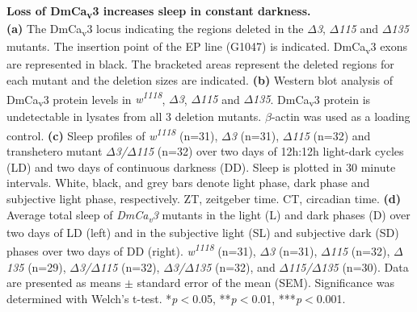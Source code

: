 \label{fig:S2}
\textbf{Loss of DmCa\textsubscript{v}3 increases sleep in constant darkness.}
\\
\textbf{(a)} The DmCa\textsubscript{v}3 locus indicating the regions deleted in the \emph{$\Delta$3}, \emph{$\Delta$115} and \emph{$\Delta$135} mutants.
The insertion point of the EP line (G1047) is indicated.
DmCa\textsubscript{v}3 exons are represented in black.
The bracketed areas represent the deleted regions for each mutant and the deletion sizes are indicated.
\textbf{(b)} Western blot analysis of DmCa\textsubscript{v}3 protein levels in \emph{w\textsuperscript{1118}}, \emph{$\Delta$3}, \emph{$\Delta$115} and \emph{$\Delta$135}.
DmCa\textsubscript{v}3 protein is undetectable in lysates from all 3 deletion mutants.
$\beta$-actin was used as a loading control.
\textbf{(c)} Sleep profiles of \emph{w\textsuperscript{1118}} (n=31), \emph{$\Delta$3} (n=31), \emph{$\Delta$115} (n=32) and transhetero mutant \emph{$\Delta$3/$\Delta$115} (n=32) over two days of 12h:12h light-dark cycles (LD) and two days of continuous darkness (DD).
Sleep is plotted in 30 minute intervals.
White, black, and grey bars denote light phase, dark phase and subjective light phase, respectively.
ZT, zeitgeber time.
CT, circadian time.
\textbf{(d)} Average total sleep of \emph{DmCa\textsubscript{v}3} mutants in the light (L) and dark phases (D) over two days of LD (left) and in the subjective light (SL) and subjective dark (SD) phases over two days of DD (right).
\emph{w\textsuperscript{1118}} (n=31), \emph{$\Delta$3} (n=31), \emph{$\Delta$115} (n=32), \emph{$\Delta$135} (n=29), \emph{$\Delta$3/$\Delta$115} (n=32), \emph{$\Delta$3/$\Delta$135} (n=32), and \emph{$\Delta$115/$\Delta$135} (n=30).
Data are presented as means $\pm$ standard error of the mean (SEM).
Significance was determined with Welch's t-test.
*\emph{p}$<$0.05, **\emph{p}$<$0.01, ***\emph{p}$<$0.001.
